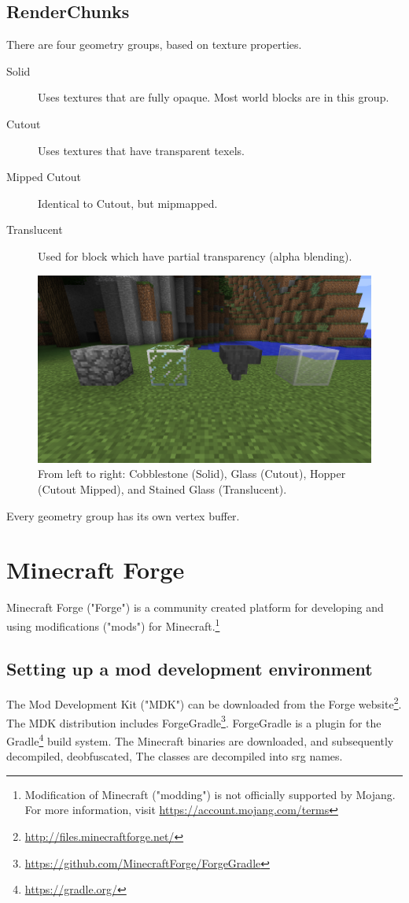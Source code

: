 \documentclass[]{article}
\begin{document}
\subsection{RenderChunks}
There are four geometry groups, based on texture properties.
\begin{description}
  \item[Solid] Uses textures that are fully opaque. Most world blocks are in this group.
  \item[Cutout] Uses textures that have transparent texels.
  \item[Mipped Cutout] Identical to Cutout, but mipmapped.
  \item[Translucent] Used for block which have partial transparency (alpha blending).
\end{description}

\begin{figure}
  \includegraphics[width=\textwidth]{ss-layers.png}
  \centering
  \caption{From left to right: Cobblestone (Solid), Glass (Cutout), Hopper (Cutout Mipped), and Stained Glass (Translucent).}
  \label{fig:ss-layers}
\end{figure}
Every geometry group has its own vertex buffer.

\section{Minecraft Forge}
Minecraft Forge ("Forge") is a community created platform for developing and using modifications ("mods") for Minecraft.\footnote{Modification of Minecraft ("modding") is not officially supported by Mojang. For more information, visit \url{https://account.mojang.com/terms}}
\subsection{Setting up a mod development environment}
The Mod Development Kit ("MDK") can be downloaded from the Forge website\footnote{\url{http://files.minecraftforge.net/}}.
The MDK distribution includes ForgeGradle\footnote{\url{https://github.com/MinecraftForge/ForgeGradle}}.
ForgeGradle is a plugin for the Gradle\footnote{\url{https://gradle.org/}} build system.
The Minecraft binaries are downloaded, and subsequently decompiled, deobfuscated, 
The classes are decompiled into srg names.
\end{document}

